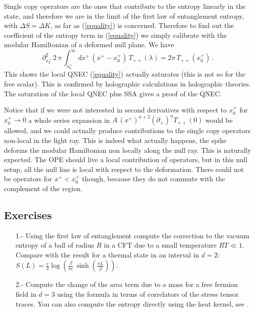 \documentclass[12pt]{article}
\numberwithin{equation}{section}
\newcommand{\be}{\begin{equation}}
\newcommand{\ee}{\end{equation}}
\begin{document}
Single copy operators are the ones that contribute to the entropy linearly in the state, and therefore we are in the limit of the first law of entanglement entropy, with $\Delta S=\Delta K$, as far as (\ref{equality}) is concerned. Therefore to find out the coefficient of the entropy term in (\ref{equality}) we simply calibrate with the modular Hamiltonian of a deformed null plane. We have
\be
\partial_{x_0^+}^2 \,2 \,\pi\,\int_{x_0^+}^\infty dx^+\, (x^+-x_0^+)\,T_{++}(\lambda)=2 \pi \, T_{++}(x_0^+)\,.
\ee
This shows the local QNEC (\ref{equality}) actually saturates (this is not so for the free scalar). 
This is confirmed by holographic calculations in holographic theories. The saturation of the local QNEC plus SSA gives a proof of the QNEC. 

Notice that if we were not interested in second derivatives with respect to $x^+_0$ for $x_0^+\rightarrow 0$ a whole series expansion in $A \,(x^+)^{n+2} (\partial_+)^n T_{++}(0)$ would be allowed, and we could actually produce contributions to the single copy operators non-local in the light ray. This is indeed what actually happens, the spike deforms the modular Hamiltonian non locally along the null ray. This is naturally expected. The OPE should live a local contribution of operators, but in this null setup, all the null line is local with respect to the deformation. There could not be operators for $x^+< x^+_0$ though, because they do not commute with the complement of the region.        

\subsection{Exercises}

\begin{itemize}

\item[1.-] Using the first law of entanglement compute the correction to the vacuum entropy of a ball of radius $R$ in a CFT due to a small temperature $R T\ll 1$. Compare with the result for a thermal state in an interval in $d=2$: $S(L)=\frac{c}{3} \log\left(\frac{\beta}{\pi\epsilon}\,\sinh\left(\frac{\pi L}{\beta}\right)\right)$.

\item[2.-] Compute the change of the area term due to a mass for a free fermion field in $d=3$ using the formula in terms of correlators of the stress tensor traces. You can also compute the entropy directly using the heat kernel, see \cite{Hertzberg:2010uv}. 

\end{itemize}
\end{document}
